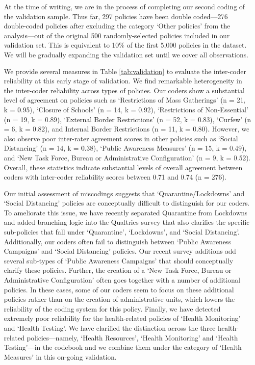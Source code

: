 \documentclass[]{article}
\begin{document}
At the time of writing, we are in the process of completing our second coding of the validation sample. Thus far, 297 policies have been double coded---276 double-coded policies after excluding the category `Other policies' from the analysis---out of the original 500 randomly-selected policies included in our validation set. This is equivalent to 10\% of the first 5,000 policies in the dataset. We will be gradually expanding the validation set until we cover all observations.

We provide several measures in Table \ref{tab:validation} to evaluate the inter-coder reliability at this early stage of validation. We find remarkable heterogeneity in the inter-coder reliability across types of policies. Our coders show a substantial level of agreement on policies such as `Restrictions of Mass Gatherings' (n = 21, k = 0.95), `Closure of Schools' (n = 14, k = 0.92), `Restrictions of Non-Essential' (n = 19, k = 0.89), `External Border Restrictions' (n = 52, k = 0.83), `Curfew' (n = 6, k = 0.82), and Internal Border Restrictions (n = 11, k = 0.80). However, we also observe poor inter-rater agreement scores in other policies such as `Social Distancing' (n = 14, k = 0.38), `Public Awareness Measures' (n = 15, k = 0.49), and `New Task Force, Bureau or Administrative Configuration' (n = 9, k = 0.52). Overall, these statistics indicate substantial levels of overall agreement between coders with inter-coder reliability scores between 0.71 and 0.74 (n = 276).

Our initial assessment of miscodings suggests that `Quarantine/Lockdowns' and `Social Distancing' policies are conceptually difficult to distinguish for our coders. To ameliorate this issue, we have recently separated Quarantine from Lockdowns and added branching logic into the Qualtrics survey that also clarifies the specific sub-policies that fall under `Quarantine', `Lockdowns', and `Social Distancing'. Additionally, our coders often fail to distinguish between `Public Awareness Campaigns' and `Social Distancing' policies. Our recent survey additions add several sub-types of `Public Awareness Campaigns' that should conceptually clarify these policies. Further, the creation of a `New Task Force, Bureau or Administrative Configuration' often goes together with a number of additional policies. In these cases, some of our coders seem to focus on these additional policies rather than on the creation of administrative units, which lowers the reliability of the coding system for this policy. Finally, we have detected extremely poor reliability for the health-related policies of `Health Monitoring' and `Health Testing'. We have clarified the distinction across the three health-related policies---namely, `Health Resources', `Health Monitoring' and `Health Testing'---in the codebook and we combine them under the category of `Health Measures' in this on-going validation.
\end{document}
